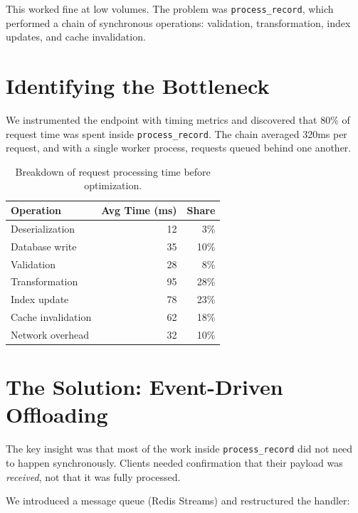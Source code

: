 \documentclass[
    language=english,
    doctype=blog-post,
    institution=none,
]{../../omnilatex}
\begin{document}
This worked fine at low volumes. The problem was \texttt{process\_record}, which
performed a chain of synchronous operations: validation, transformation, index
updates, and cache invalidation.

\section{Identifying the Bottleneck}

We instrumented the endpoint with timing metrics and discovered that 80\% of
request time was spent inside \texttt{process\_record}. The chain averaged 320ms
per request, and with a single worker process, requests queued behind one another.

\begin{table}[h]
    \centering
    \begin{tabular}{lrr}
        \toprule
        \textbf{Operation} & \textbf{Avg Time (ms)} & \textbf{Share} \\
        \midrule
        Deserialization     & 12   & 3\%   \\
        Database write      & 35   & 10\%  \\
        Validation          & 28   & 8\%   \\
        Transformation      & 95   & 28\%  \\
        Index update        & 78   & 23\%  \\
        Cache invalidation  & 62   & 18\%  \\
        Network overhead    & 32   & 10\%  \\
        \bottomrule
    \end{tabular}
    \caption{Breakdown of request processing time before optimization.}
\end{table}

\section{The Solution: Event-Driven Offloading}

The key insight was that most of the work inside \texttt{process\_record} did not
need to happen synchronously. Clients needed confirmation that their payload was
\emph{received}, not that it was fully processed.

We introduced a message queue (Redis Streams) and restructured the handler:
\end{document}
